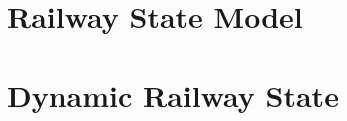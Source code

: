 \documentclass[11pt,a4paper,oneside,openany]{scrbook}
\newif\ifaimGerman
\theoremstyle{plain}
\theoremstyle{definition}
\theoremstyle{remark}
\begin{document}

\ifaimGerman
  
\else
  
\fi
\ifaimGerman
  
\else
  
\fi
\ifaimGerman
  
\else
  
\fi
\ifaimGerman
  
\else
  
\fi

\ifaimGerman
  \part{Eisenbahn-Zustandsmodell}
\else
  \part{Railway State Model}
\fi

\ifaimGerman
  
\else
  
\fi


\ifaimGerman
  
\else
  
\fi
\ifaimGerman
  
\else
  
\fi


\ifaimGerman
  
  
  
\else
  
  
  
\fi
\ifaimGerman
  
\else
  
\fi

\ifaimGerman
  \part{Dynamischer Eisenbahnzustand}
\else
  \part{Dynamic Railway State}
\fi
\end{document}
